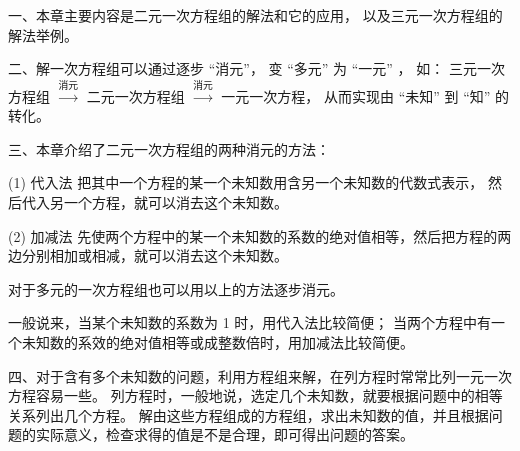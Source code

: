 \xiaojie

一、本章主要内容是二元一次方程组的解法和它的应用， 以及三元一次方程组的解法举例。

\jiange
二、解一次方程组可以通过逐步 “消元”， 变 “多元” 为 “一元” ， 如：
\jiange 三元一次方程组 $\xrightarrow{\text{消元}}$ 二元一次方程组 $\xrightarrow{\text{消元}}$ 一元一次方程，
从而实现由 “未知” 到 “知” 的转化。


三、本章介绍了二元一次方程组的两种消元的方法：

(1) 代入法 \quad 把其中一个方程的某一个未知数用含另一个未知数的代数式表示， 然后代入另一个方程，就可以消去这个未知数。

(2) 加减法 \quad 先使两个方程中的某一个未知数的系数的绝对值相等，然后把方程的两边分别相加或相减，就可以消去这个未知数。

对于多元的一次方程组也可以用以上的方法逐步消元。

一般说来，当某个未知数的系数为 1 时，用代入法比较简便； 当两个方程中有一个未知数的系效的绝对值相等或成整数倍时，用加减法比较简便。

四、对于含有多个未知数的问题，利用方程组来解，在列方程时常常比列一元一次方程容易一些。
列方程时，一般地说，选定几个未知数，就要根据问题中的相等关系列出几个方程。
解由这些方程组成的方程组，求出未知数的值，并且根据问题的实际意义，检查求得的值是不是合理，即可得出问题的答案。

